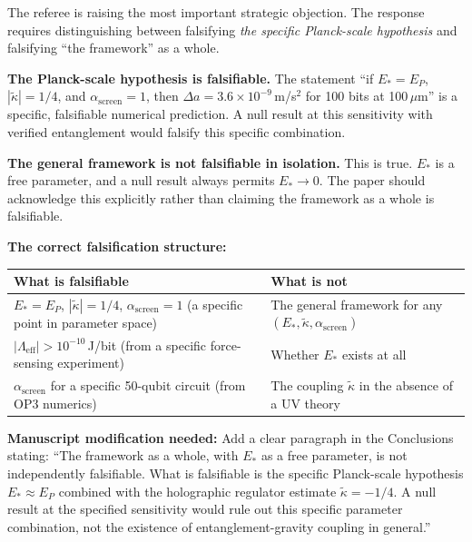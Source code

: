 \documentclass[11pt,letterpaper]{article}
\newcommand{\kt}{\tilde{\kappa}}
\newcommand{\Leff}{\Lambda_{\mathrm{eff}}}
\begin{document}
\begin{tcolorbox}[breakable,enhanced,colback=green!3,colframe=green!55!black,
  fonttitle=\bfseries,title={Response},boxrule=0.8pt]
The referee is raising the most important strategic objection.  The response requires
distinguishing between falsifying \emph{the specific Planck-scale hypothesis} and
falsifying ``the framework'' as a whole.

\textbf{The Planck-scale hypothesis is falsifiable.}
The statement ``if $E_* = E_P$, $|\kt| = 1/4$, and $\alpha_{\mathrm{screen}} = 1$, then
$\Delta a = 3.6\times10^{-9}$\,m/s$^2$ for 100 bits at 100\,$\mu$m'' is a specific,
falsifiable numerical prediction.  A null result at this sensitivity with verified
entanglement would falsify this specific combination.

\textbf{The general framework is not falsifiable in isolation.}  This is true.  $E_*$
is a free parameter, and a null result always permits $E_* \to 0$.  The paper should
acknowledge this explicitly rather than claiming the framework as a whole is falsifiable.

\textbf{The correct falsification structure:}
\begin{center}\small
\begin{tabular}{@{}p{5.5cm}p{5cm}@{}}
\toprule
What is falsifiable & What is not \\
\midrule
$E_* = E_P$, $|\kt| = 1/4$, $\alpha_{\mathrm{screen}} = 1$ (a specific point in parameter space) &
The general framework for any $(E_*, \kt, \alpha_{\mathrm{screen}})$ \\
\addlinespace
$|\Leff| > 10^{-10}$\,J/bit (from a specific force-sensing experiment) &
Whether $E_*$ exists at all \\
\addlinespace
$\alpha_{\mathrm{screen}}$ for a specific 50-qubit circuit (from OP3 numerics) &
The coupling $\kt$ in the absence of a UV theory \\
\bottomrule
\end{tabular}
\end{center}

\textbf{Manuscript modification needed:} Add a clear paragraph in the Conclusions
stating: ``The framework as a whole, with $E_*$ as a free parameter, is not independently
falsifiable. What is falsifiable is the specific Planck-scale hypothesis $E_* \approx E_P$
combined with the holographic regulator estimate $\kt = -1/4$.  A null result at the
specified sensitivity would rule out this specific parameter combination, not the
existence of entanglement-gravity coupling in general.''
\end{tcolorbox}
\end{document}

